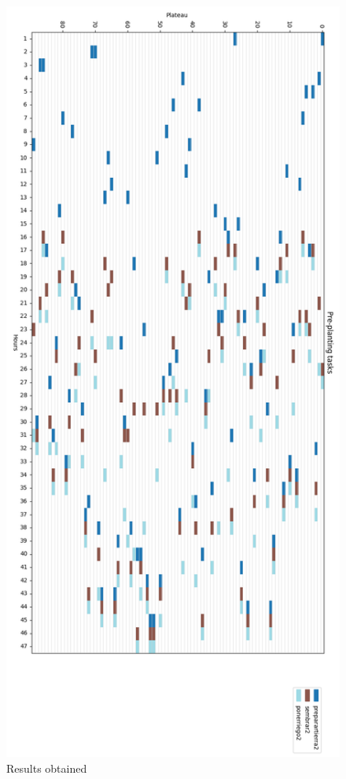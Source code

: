 \begin{figure}[ht!]
    \centering
    \includegraphics[scale=0.4]{img/grafico_pre_siembra2.png}
    \caption{Results obtained}
    \label{fig:resultados_pre2}
\end{figure}
